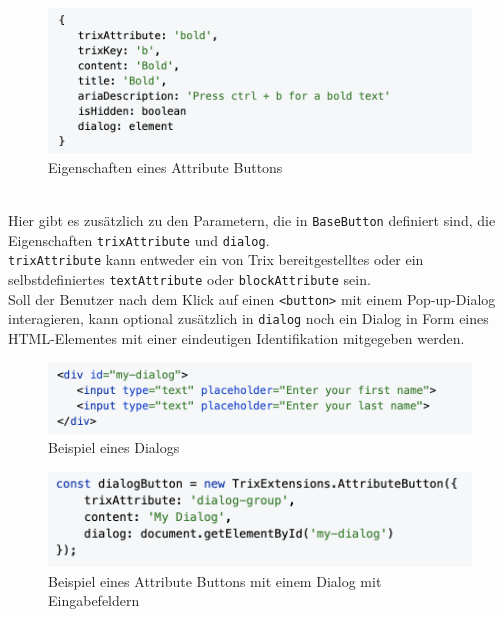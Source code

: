 \begin{figure}[H]
\begin{center}
	\includegraphics[scale=.7]{images/attribute-button.png}
\end{center}
	\caption{Eigenschaften eines Attribute Buttons}
\end{figure}

\mbox{}\\
Hier gibt es zusätzlich zu den Parametern, die in \texttt{BaseButton} definiert sind, die Eigenschaften \texttt{trixAttribute} und 
\texttt{dialog}. \\
\texttt{trixAttribute} kann entweder ein von Trix bereitgestelltes oder ein selbstdefiniertes \texttt{textAttribute} oder 
\texttt{blockAttribute} sein. \\
Soll der Benutzer nach dem Klick auf einen \texttt{<button>} mit einem Pop-up-Dialog interagieren, kann optional zusätzlich in
\texttt{dialog} noch ein Dialog in Form eines HTML-Elementes mit einer eindeutigen Identifikation mitgegeben werden.

\begin{figure}[H]
\begin{center}
	\includegraphics[scale=.7]{images/dialog-example.png}
\end{center}
	\caption{Beispiel eines Dialogs}
\end{figure}

\begin{figure}[H]
\begin{center}
	\includegraphics[scale=.7]{images/attribute-button-dialog-example.png}
\end{center}
	\caption{Beispiel eines Attribute Buttons mit einem Dialog mit Eingabefeldern}
\end{figure}

